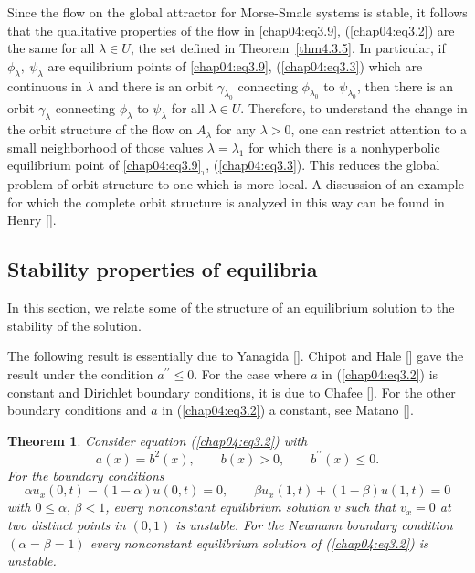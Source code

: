 \documentclass{surv-l}
\theoremstyle{plain}
\newtheorem{theorem}{Theorem}[section]
\theoremstyle{definition}
\numberwithin{equation}{section}
\numberwithin{figure}{chapter}
\renewcommand\theequation{\arabic{section}.\arabic{equation}}
\begin{document}
Since the flow on the global attractor for Morse-Smale systems is stable, it follows that the qualitative properties of the flow in \ref{chap04:eq3.9}, (\ref{chap04:eq3.2}) are the same for all $\lambda \in U$, the set defined in Theorem~\ref{thm4.3.5}. In particular, if $\phi_{\lambda},\ \psi_{\lambda}$ are equilibrium points of \ref{chap04:eq3.9}, (\ref{chap04:eq3.3}) which are continuous in $\lambda$ and there is an orbit $\gamma_{\lambda_{0}}$ connecting $\phi_{\lambda_{0}}$ to $\psi_{\lambda_{0}}$, then there is an orbit $\gamma_{\lambda}$ connecting $\phi_{\lambda}$ to $\psi_{\lambda}$ for all $\lambda\in U$. Therefore, to understand the change in the orbit structure of the flow on $A_{\lambda}$ for any $\lambda>0$, one can restrict attention to a small neighborhood of those values $\lambda=\lambda_{1}$ for which there is a nonhyperbolic equilibrium point of \ref{chap04:eq3.9}$_{_1}$, (\ref{chap04:eq3.3}). This reduces the global problem of orbit structure to one which is more local. A discussion of an example for which the complete orbit structure is analyzed in this way can be found in Henry [\citeyear{1985henry}].

\subsection{Stability properties of equilibria}\label{subsec4.3.3} In this section, we relate some of the structure of an equilibrium solution to the stability of the solution.

The following result is essentially due to Yanagida [\citeyear{1982y}]. Chipot and Hale [\citeyear{1983ch}] gave the result under the condition $a^{\prime\prime}\leq 0$. For the case where $a$ in (\ref{chap04:eq3.2}) is constant and Dirichlet boundary conditions, it is due to Chafee [\citeyear{1975c}]. For the other boundary conditions and $a$ in (\ref{chap04:eq3.2}) a constant, see Matano [\citeyear{1982m}].

\begin{theorem}\label{thm4.3.6} Consider equation \emph{(\ref{chap04:eq3.2})} with
\renewcommand\theequation{\arabic{equation}}
\setcounter{equation}{9}
\renewcommand\theequation{\arabic{section}.\arabic{equation}}
\begin{equation}\label{chap04:eq3.10}
a(x)=b^{2}(x),\qquad b(x)>0,\qquad b^{\prime\prime}(x)\leq 0.
\end{equation}
For the boundary conditions
\begin{equation}\label{chap04:eq3.11}
\alpha u_{x}(0, t)-(1-\alpha)u(0, t)=0,\qquad \beta u_{x}(1, t)+(1-\beta)u(1, t)=0
\end{equation}
with $ 0\leq\alpha,\,\beta<1$, every nonconstant equilibrium solution $v$ such that $v_{x}=0$ at two distinct points in $(0,1)$ is unstable. For the Neumann boundary condition $(\alpha=\beta=1)$ every nonconstant equilibrium solution of \emph{(\ref{chap04:eq3.2})} is unstable.
\end{theorem}
\end{document}
